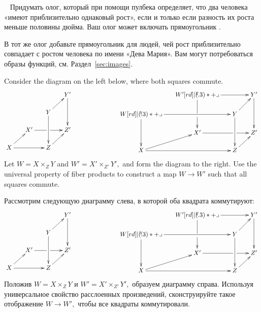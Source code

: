 \documentclass[../main/CT4S-EN-RU]{subfiles}
\begin{document}
\begin{exerciseRUS}~
\sexc Придумать олог, который при помощи пулбека определяет, что два человека «имеют приблизительно однаковый рост», если и только если разность их роста меньше половины дюйма. Ваш олог может включать прямоугольник . 
\item В тот же олог добавьте прямоугольник для людей, чей рост приблизительно совпадает с ростом человека по имени «Дева Мария». Вам могут потребоваться образы функций, см. Раздел~\ref{sec:images}.
\endsexc
\end{exerciseRUS}

\begin{exerciseENG}\label{exc:pointwise map of fp}
Consider the diagram on the left below, where both squares commute. 
$$
\xymatrix@=15pt{
&&&Y'\ar[dd]\\
&&Y\ar[ru]\ar[dd]\\
&X'\ar'[r][rr]&&Z'\\
X\ar[rr]\ar[ru]&&Z\ar[ru]
}
\hspace{1in}
\xymatrix@=15pt{
&W'\ar[rr]\ar'[d][dd]\ullimit&&Y'\ar[dd]\\
W\ar[rr]\ar[dd]\ullimit&&Y\ar[ru]\ar[dd]\\
&X'\ar'[r][rr]&&Z'\\
X\ar[rr]\ar[ru]&&Z\ar[ru]
}
$$
Let $W=X\times_ZY$ and $W'=X'\times_{Z'}Y',$ and form the diagram to the right. Use the universal property of fiber products to construct a map $W{→} W'$ such that all squares commute.
\end{exerciseENG}

\begin{exerciseRUS}[*]\label{exc:pointwise map of fp}
Рассмотрим следующую диаграмму слева, в которой оба квадрата коммутируют: 
$$
\xymatrix@=15pt{
&&&Y'\ar[dd]\\
&&Y\ar[ru]\ar[dd]\\
&X'\ar'[r][rr]&&Z'\\
X\ar[rr]\ar[ru]&&Z\ar[ru]
}
\hspace{1in}
\xymatrix@=15pt{
&W'\ar[rr]\ar'[d][dd]\ullimit&&Y'\ar[dd]\\
W\ar[rr]\ar[dd]\ullimit&&Y\ar[ru]\ar[dd]\\
&X'\ar'[r][rr]&&Z'\\
X\ar[rr]\ar[ru]&&Z\ar[ru]
}
$$
Положив $W=X\times_ZY$ и $W'=X'\times_{Z'}Y',$ образуем диаграмму справа. Используя универсальное свойство расслоенных произведений, сконструируйте такое отображение $W{→} W',$ чтобы все квадраты коммутировали.
\end{exerciseRUS}
\end{document}
